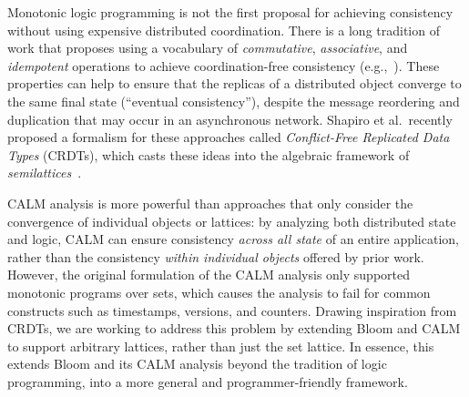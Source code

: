 Monotonic logic programming is not the first proposal for achieving consistency without using expensive distributed coordination.  There is a long tradition of work that proposes 
using a vocabulary of \emph{commutative},
\emph{associative}, and \emph{idempotent} operations to achieve coordination-free consistency
(e.g.,~\cite{dynamo,quicksand,Reiher1994,bayou}). These properties can help to ensure that the
replicas of a distributed object converge to the same final state (``eventual
consistency''), despite the message reordering and duplication that may occur in
an asynchronous network. Shapiro et al.\ recently proposed a formalism for these
approaches called \emph{Conflict-Free Replicated Data Types} (CRDTs), which
casts these ideas into the algebraic framework of
\emph{semilattices}~\cite{Shapiro2011a,Shapiro2011b}.

CALM analysis is more powerful than approaches that only consider the
convergence of individual objects or lattices: by analyzing both distributed
state and logic, CALM can ensure consistency \emph{across all state} of an
entire application, rather than the consistency \emph{within individual objects}
offered by prior work. However, the original formulation of the CALM analysis
only supported monotonic programs over sets, which causes the analysis to fail
for common constructs such as timestamps, versions, and counters. Drawing
inspiration from CRDTs, we are working to address this problem by extending
Bloom and CALM to support arbitrary lattices, rather than just the set lattice.
In essence, this extends Bloom and its CALM analysis beyond the tradition of
logic programming, into a more general and programmer-friendly framework.

